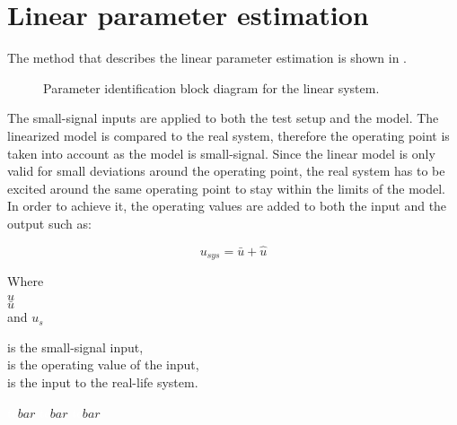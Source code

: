 \section{Linear parameter estimation} 
\label{LinParamEst}


The method that describes the linear parameter estimation is shown in .

\begin{figure}[H]
\centering
 
\caption{Parameter identification block diagram for the linear system. }
\label{fig:parame_block_lin}
\end{figure}

The small-signal inputs are applied to both the test setup and the model. The linearized model is compared to the real system, therefore the operating point is taken into account as the model is small-signal. Since the linear model is only valid for small deviations around the operating point, the real system has to be excited around the same operating point to stay within the limits of the model. In order to achieve it, the operating values are added to both the input and the output such as: 

\begin{equation}
u_{sys} = \bar{u} + \hat{u}
 \label{u_smallsignal}
\end{equation}

\begin{minipage}[t]{0.20\textwidth}
Where\\
\hspace*{8mm} $\hat{u}$ \\
\hspace*{8mm} $\bar{u}$ \\
and \hspace*{0.7mm} $u_{s}$ 
\end{minipage}
\begin{minipage}[t]{0.68\textwidth}
\vspace*{2mm}
is the small-signal input, \\
is the operating value of the input,\\
is the input to the real-life system. 
\end{minipage}
\begin{minipage}[t]{0.10\textwidth}
\vspace*{2mm}
\textcolor{White}{te}$\unit{bar}$
\textcolor{White}{te}$\unit{bar}$
\textcolor{White}{te}$\unit{bar}$
\end{minipage} 

